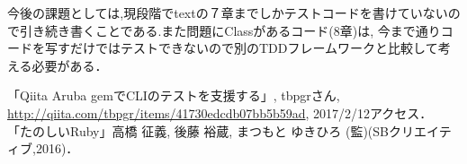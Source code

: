 \documentclass[10pt,a4j,twocolumn]{jsarticle}
\begin{document}
今後の課題としては,現段階でtextの７章までしかテストコードを書けていないので引き続き書くことである.また問題にClassがあるコード(8章)は, 今まで通りコードを写すだけではテストできないので別のTDDフレームワークと比較して考える必要がある．


\begin{thebibliography}{9}
「Qiita Aruba gemでCLIのテストを支援する」, tbpgrさん, \url{http://qiita.com/tbpgr/items/41730edcdb07bb5b59ad}, 2017/2/12アクセス．
「たのしいRuby」高橋 征義, 後藤 裕蔵, まつもと ゆきひろ (監)(SBクリエイティブ,2016)．
\end{thebibliography}
\end{document}
